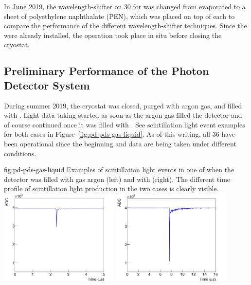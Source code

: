 In June 2019, the wavelength-shifter on 30  for  was changed from evaporated  to a sheet of polyethylene naphthalate (PEN), which was placed on top of each  to compare the performance of the different wavelength-shifter techniques. Since the  were already installed, the operation took place in situ before closing the cryostat. 


\subsection{Preliminary Performance of the  Photon Detector System}

During summer 2019, the  cryostat was closed, purged with argon gas, and filled with . Light data taking started %
as soon as the argon gas filled the detector and of course continued once it was filled with  . See scintillation light event examples for both cases in Figure~\ref{fig:pd-pds-gas-liquid}. As of this writing, all 36  have been operational since the beginning and data are being taken under different conditions.

\begin{dunefigure}{fig:pd-pds-gas-liquid} {Examples of scintillation light events in one  of  when the detector was filled with gas argon (left) and with  (right). The different time profile of scintillation light production in the two cases is clearly visible.}
\includegraphics[width=0.45\textwidth]{graphics/dppd_gas.png}
\includegraphics[width=0.45\textwidth]{graphics/dppd_liquid.png}
\end{dunefigure}

